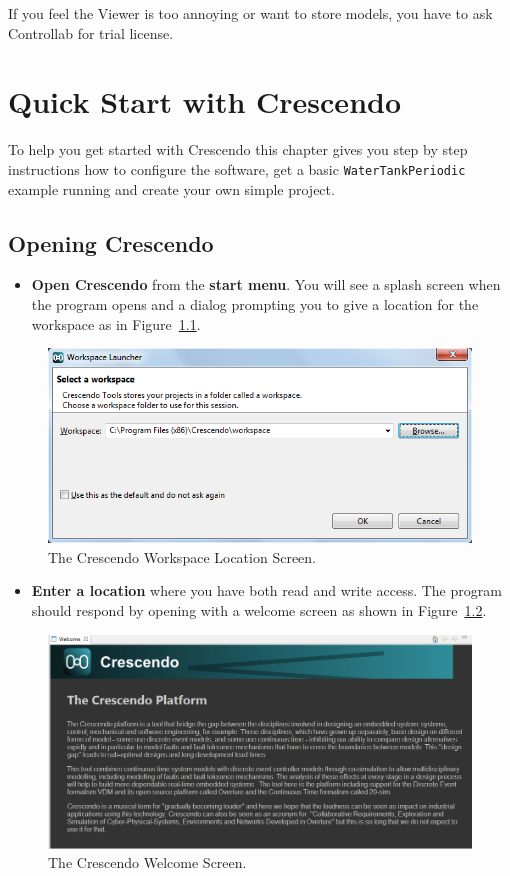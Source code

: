 \documentclass{crescendorepchap}
\begin{document}
If you feel the Viewer is too annoying or want to store models, you have
to ask Controllab for trial license.

\chapter{Quick Start with Crescendo} \label{chap:gettingstarted}

To help you get started with Crescendo this chapter gives you step
by step instructions how to configure the software, get a basic
\texttt{WaterTankPeriodic} example running and create your own simple project.


\section{Opening Crescendo}

\begin{itemize}
\item
  \textbf{Open Crescendo} from the \textbf{start menu}.
You will see a splash screen when the program opens and a dialog
prompting you to give a location for the workspace as in Figure~\ref{fig:wsloc}.
\end{itemize}

\begin{figure}[htbp]
\centering
\includegraphics[width=.8\textwidth]{images/DestecsWorkspaceLocation.png}
\caption{The Crescendo Workspace Location Screen.\label{fig:wsloc}}
\end{figure}

\begin{itemize}
\item
  \textbf{Enter a location} where you have both read and write access.
The program should respond by opening with a welcome screen as shown in Figure~\ref{fig:welcome}.
\end{itemize}

\begin{figure}[htbp]
\centering
\includegraphics[width=.8\textwidth]{images/DestecsSplash.png}
\caption{The Crescendo Welcome Screen.\label{fig:welcome}}
\end{figure}
\end{document}
